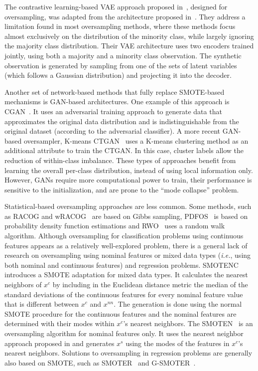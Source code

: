 The contrastive learning-based VAE approach proposed
in~\cite{dai2019generative}, designed for oversampling, was adapted from
the architecture proposed in~\cite{abid2019contrastive}. They address a
limitation found in most oversampling methods, where these methods focus
almost exclusively on the distribution of the minority class, while largely
ignoring the majority class distribution. Their VAE architecture uses two
encoders trained jointly, using both a majority and a minority class
observation. The synthetic observation is generated by sampling from one of
the sets of latent variables (which follows a Gaussian distribution) and
projecting it into the decoder.

Another set of network-based methods that fully replace SMOTE-based mechanisms
is GAN-based architectures. One example of this approach is
CGAN~\cite{douzas2018effective}. It uses an adversarial training approach to
generate data that approximates the original data distribution and is
indistinguishable from the original dataset (according to the adversarial
classifier). A more recent GAN-based oversampler, K-means CTGAN~\cite{an2021k}
uses a K-means clustering method as an additional attribute to train the
CTGAN\@. In this case, cluster labels allow the reduction of within-class
imbalance. These types of approaches benefit from learning the overall
per-class distribution, instead of using local information only. However, GANs
require more computational power to train, their performance is sensitive to
the initialization, and are prone to the ``mode collapse'' problem.

Statistical-based oversampling approaches are less common. Some methods, such
as RACOG and wRACOG~\cite{das2014racog} are based on Gibbs sampling,
PDFOS~\cite{gao2014pdfos} is based on probability density function estimations
and RWO~\cite{zhang2014rwo} uses a random walk algorithm. Although
oversampling for classification problems using continuous features appears as
a relatively well-explored problem, there is a general lack of research on
oversampling using nominal features or mixed data types (\textit{i.e.}, using
both nominal and continuous features) and regression problems.
SMOTENC~\cite{chawla2002smote} introduces a SMOTE adaptation for mixed data
types. It calculates the nearest neighbors of $x^c$ by including in the
Euclidean distance metric the median of the standard deviations of the
continuous features for every nominal feature value that is different
between $x^c$ and $x^{nn}$. The generation is done using the normal SMOTE
procedure for the continuous features and the nominal features are determined
with their modes within $x^c$'s nearest neighbors. The
SMOTEN~\cite{chawla2002smote} is an oversampling algorithm for nominal
features only. It uses the nearest neighbor approach proposed in
\cite{cost1993weighted} and generates $x^s$ using the modes of the features
in $x^c$'s nearest neighbors. Solutions to oversampling in regression problems
are generally also based on SMOTE, such as SMOTER~\cite{torgo2013smote} and
G-SMOTER~\cite{camacho2022geometric}.

